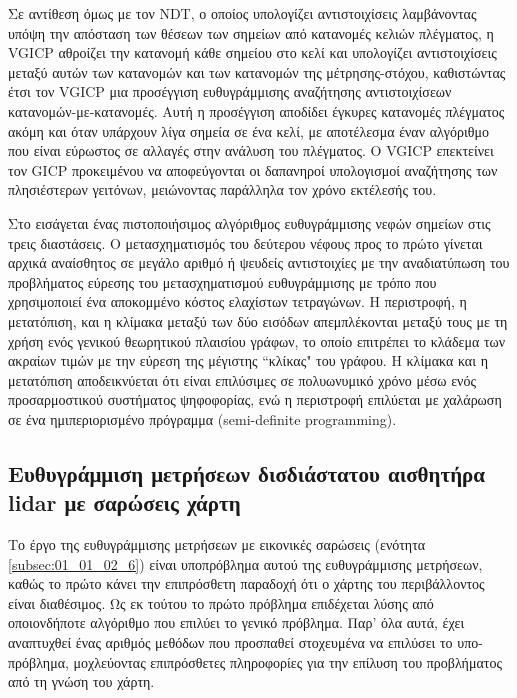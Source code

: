 Σε αντίθεση όμως με τον NDT, ο οποίος υπολογίζει αντιστοιχίσεις λαμβάνοντας
υπόψη την απόσταση των θέσεων των σημείων από κατανομές κελιών πλέγματος, η
VGICP \cite{Koide2021a} αθροίζει την κατανομή κάθε σημείου στο κελί και
υπολογίζει αντιστοιχίσεις μεταξύ αυτών των κατανομών και των κατανομών της
μέτρησης-στόχου, καθιστώντας έτσι τον VGICP μια προσέγγιση ευθυγράμμισης
αναζήτησης αντιστοιχίσεων κατανομών-με-κατανομές. Αυτή η προσέγγιση αποδίδει
έγκυρες κατανομές πλέγματος ακόμη και όταν υπάρχουν λίγα σημεία σε ένα κελί, με
αποτέλεσμα έναν αλγόριθμο που είναι εύρωστος σε αλλαγές στην ανάλυση του
πλέγματος. Ο VGICP επεκτείνει τον GICP \cite{Segal2009a} προκειμένου να
αποφεύγονται οι δαπανηροί υπολογισμοί αναζήτησης των πλησιέστερων γειτόνων,
μειώνοντας παράλληλα τον χρόνο εκτέλεσής του.

Στο \cite{Yang2021} εισάγεται ένας πιστοποιήσιμος αλγόριθμος ευθυγράμμισης
νεφών σημείων στις τρεις διαστάσεις. Ο μετασχηματισμός του δεύτερου νέφους προς
το πρώτο γίνεται αρχικά αναίσθητος σε μεγάλο αριθμό ή ψευδείς αντιστοιχίες με
την αναδιατύπωση του προβλήματος εύρεσης του μετασχηματισμού ευθυγράμμισης με
τρόπο που χρησιμοποιεί ένα αποκομμένο κόστος ελαχίστων τετραγώνων. Η
περιστροφή, η μετατόπιση, και η κλίμακα μεταξύ των δύο εισόδων απεμπλέκονται
μεταξύ τους με τη χρήση ενός γενικού θεωρητικού πλαισίου γράφων, το οποίο
επιτρέπει το κλάδεμα των ακραίων τιμών με την εύρεση της μέγιστης ``κλίκας" του
γράφου.  Η κλίμακα και η μετατόπιση αποδεικνύεται ότι είναι επιλύσιμες σε
πολυωνυμικό χρόνο μέσω ενός προσαρμοστικού συστήματος ψηφοφορίας, ενώ η
περιστροφή επιλύεται με χαλάρωση σε ένα ημιπεριορισμένο πρόγραμμα
(semi-definite programming).

\subsection{Ευθυγράμμιση μετρήσεων δισδιάστατου αισθητήρα lidar με σαρώσεις
χάρτη}
\label{subsection:02_02_02:2}

Το έργο της ευθυγράμμισης μετρήσεων με εικονικές σαρώσεις (ενότητα
\ref{subsec:01_01_02_6}) είναι υποπρόβλημα αυτού της ευθυγράμμισης μετρήσεων,
καθώς το πρώτο κάνει την επιπρόσθετη παραδοχή ότι ο χάρτης του περιβάλλοντος
είναι διαθέσιμος. Ως εκ τούτου το πρώτο πρόβλημα επιδέχεται λύσης από
οποιονδήποτε αλγόριθμο που επιλύει το γενικό πρόβλημα. Παρ' όλα αυτά, έχει
αναπτυχθεί ένας αριθμός μεθόδων που προσπαθεί στοχευμένα να επιλύσει το
υπο-πρόβλημα, μοχλεύοντας επιπρόσθετες πληροφορίες για την επίλυση του
προβλήματος από τη γνώση του χάρτη.

